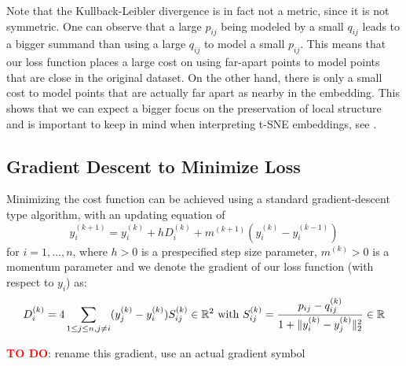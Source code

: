 Note that the Kullback-Leibler divergence is in fact not a metric, since it is not symmetric. 
One can observe that a large $p_{ij}$ being modeled by a small $q_{ij}$ leads to a bigger summand than using a large $q_{ij}$ to model a small $p_{ij}$. 
This means that our loss function places a large cost on using far-apart points to model points that are close in the original dataset. 
On the other hand, there is only a small cost to model points that are actually far apart as nearby in the embedding. 
This shows that we can expect a bigger focus on the preservation of local structure and is important to keep in mind when interpreting t-SNE embeddings, see \cite{Wa16Distill}. 

\subsection{Gradient Descent to Minimize Loss}
Minimizing the cost function can be achieved using a standard gradient-descent type algorithm, with an updating equation of 
\begin{equation}
    y_i^{(k+1)} = y_i^{(k)} + h D_i^{(k)} + m^{(k+1)}(y_i^{(k)} - y_i^{(k-1)}) 
\end{equation}
for $i=1,\dots,n$, where $h >0$ is a prespecified step size parameter, $m^{(k)} > 0$ is a momentum parameter and we denote the gradient of our loss function (with respect to $y_i$) as: 
\begin{equation}
    D_i^{(k)} = 4 \sum_{1 \leq j \leq n, j \neq i} (y_j^{(k)} - y_i^{(k)}) S_{ij}^{(k)} \in \mathbb{R}^2 \text{ with } S_{ij}^{(k)} = \frac{p_{ij} - q_{ij}^{(k)}}{1+ \lVert y_i^{(k)}-y_j^{(k)}\rVert_2^2 } \in \mathbb{R}
\end{equation}

\textcolor{red}{\textbf{TO DO}}: rename this gradient, use an actual gradient symbol 